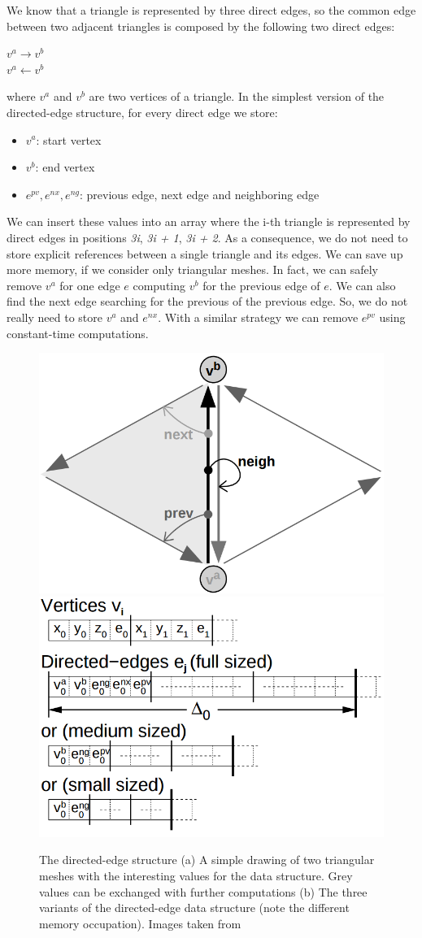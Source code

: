 We know that a triangle is represented by three direct edges, so the common edge between two adjacent triangles is composed by the following two direct edges:
\begin{center}
   $v^{a} \rightarrow v^{b}$\\
   $v^{a} \leftarrow v^{b}$
\end{center}

where $v^{a}$ and $v^{b}$ are two vertices of a triangle. In the simplest version of the directed-edge structure, for every direct edge we store:
\begin{itemize}
 \item $v^{a}$: start vertex
 \item $v^{b}$: end vertex
 \item $e^{pv}, e^{nx}, e^{ng}$: previous edge, next edge and neighboring edge
\end{itemize}

We can insert these values into an array where the i-th triangle is represented by direct edges in positions \textit{3i}, \textit{3i + 1}, \textit{3i + 2}. As a consequence, we do not need to store explicit references between a single triangle and its edges. We can save up more memory, if we consider only triangular meshes. In fact, we can safely remove $v^{a}$ for one edge $e$ computing $v^{b}$ for the previous edge of $e$. We can also find the next edge searching for the previous of the previous edge. So, we do not really need to store $v^{a}$ and $e^{nx}$. With a similar strategy we can remove $e^{pv}$ using constant-time computations.

\begin{figure}[htb] %
   \centering
   \includegraphics[width=0.45\linewidth]{images/directed-edge0.png}\hfill
   \includegraphics[width=0.45\linewidth]{images/directed-edge1.png}
   \caption[The directed-edge structure]{The directed-edge structure (a) A simple drawing of two triangular meshes with the interesting values for the data structure. Grey values can be exchanged with further computations (b) The three variants of the directed-edge data structure (note the different memory occupation). Images taken from~\cite{Campagna}}
   \label{fig:directedEdge}
\end{figure}

